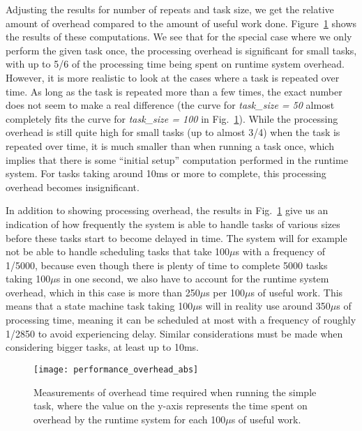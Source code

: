 \noindent
Adjusting the results for number of repeats and task size, we get the relative amount of overhead compared to the amount of useful work done. Figure~\ref{fig:performance_overhead_abs} shows the results of these computations. We see that for the special case where we only perform the given task once, the processing overhead is significant for small tasks, with up to 5/6 of the processing time being spent on runtime system overhead. However, it is more realistic to look at the cases where a task is repeated over time. As long as the task is repeated more than a few times, the exact number does not seem to make a real difference (the curve for \emph{task\_size = 50} almost completely fits the curve for \emph{task\_size = 100} in Fig.~\ref{fig:performance_overhead_abs}). While the processing overhead is still quite high for small tasks (up to almost 3/4) when the task is repeated over time, it is much smaller than when running a task once, which implies that there is some ``initial setup'' computation performed in the runtime system. For tasks taking around 10ms or more to complete, this processing overhead becomes insignificant.

\noindent
In addition to showing processing overhead, the results in Fig.~\ref{fig:performance_overhead_abs} give us an indication of how frequently the system is able to handle tasks of various sizes before these tasks start to become delayed in time. The system will for example not be able to handle scheduling tasks that take 100$\mu$s with a frequency of 1/5000, because even though there is plenty of time to complete 5000 tasks taking 100$\mu$s in one second, we also have to account for the runtime system overhead, which in this case is more than 250$\mu$s per 100$\mu$s of useful work. This means that a state machine task taking 100$\mu$s will in reality use around 350$\mu$s of processing time, meaning it can be scheduled at most with a frequency of roughly 1/2850 to avoid experiencing delay. Similar considerations must be made when considering bigger tasks, at least up to 10ms.

\begin{figure}[htp]
	\centering
	\texttt{[image: performance\_overhead\_abs]}
	\caption[Results of performance overhead test, absolute comparison]{Measurements of overhead time required when running the simple task, where the value on the y-axis represents the time spent on overhead by the runtime system for each 100$\mu$s of useful work.}
	\label{fig:performance_overhead_abs}
\end{figure}

